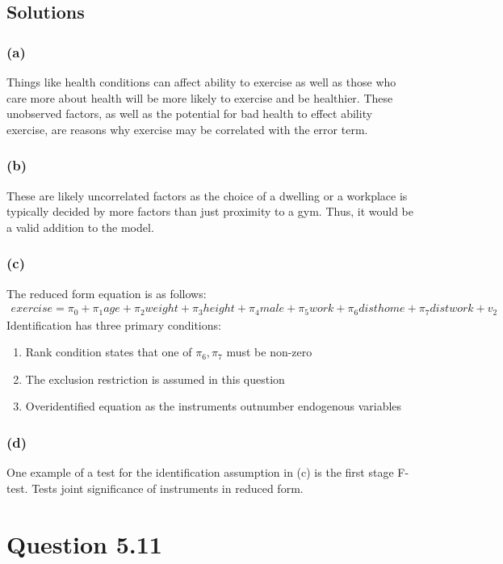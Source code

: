 \documentclass[10pt, a4paper]{article}
\begin{document}
  \subsection*{Solutions}
    \subsubsection*{(a)}
      Things like health conditions can affect ability to exercise as well as those who care more about health will be more likely to exercise and be healthier. These unobserved factors, as well as the potential for bad health to effect ability exercise, are reasons why exercise may be correlated with the error term.
    \subsubsection*{(b)}
      These are likely uncorrelated factors as the choice of a dwelling or a workplace is typically decided by more factors than just proximity to a gym. Thus, it would be a valid addition to the model.
    \subsubsection*{(c)}
      The reduced form equation is as follows:
      \begin{gather*}
        exercise = \pi_0 + \pi_1age + \pi_2weight + \pi_3height + \pi_4male + \pi_5work + \pi_6disthome + \pi_7distwork + v_2
      \end{gather*}
      Identification has three primary conditions:
      \begin{enumerate}
        \item Rank condition states that one of $\pi_6,\pi_7$ must be non-zero \\
        \item The exclusion restriction is assumed in this question \\
        \item Overidentified equation as the instruments outnumber endogenous variables
      \end{enumerate}
    \subsubsection*{(d)}
      One example of a test for the identification assumption in (c) is the first stage F-test. Tests joint significance of instruments in reduced form.
\section*{Question 5.11}
\end{document}
